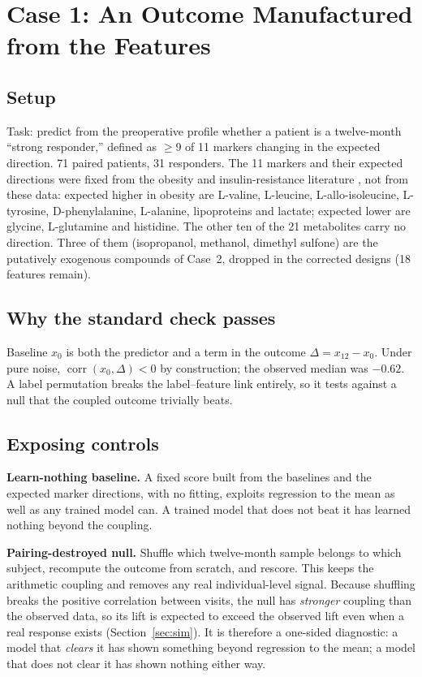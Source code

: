 \documentclass[conference]{IEEEtran}
\newcommand{\verified}[1]{#1}  %
\begin{document}
\section{Case 1: An Outcome Manufactured from the Features}
\label{sec:case1}

\subsection{Setup}
Task: predict from the preoperative profile whether a patient is a
twelve-month ``strong responder,'' defined as $\geq$9 of 11 markers changing
in the expected direction. 71 paired patients, 31 responders. The 11 markers
and their expected directions were fixed from the obesity and insulin-resistance
literature \cite{newgard2009, wang2011}, not from these data: expected higher in
obesity are L-valine, L-leucine, L-allo-isoleucine, L-tyrosine,
D-phenylalanine, L-alanine, lipoproteins and lactate; expected lower are
glycine, L-glutamine and histidine. The other ten of the 21 metabolites carry no
direction. Three of them (isopropanol, methanol, dimethyl sulfone) are the
putatively exogenous compounds of Case~2, dropped in the corrected designs
(18 features remain).

\subsection{Why the standard check passes}
Baseline $x_0$ is both the predictor and a term in the outcome
$\Delta = x_{12} - x_0$. Under pure noise, $\operatorname{corr}(x_0, \Delta)<0$
by construction; the observed median was \verified{$-0.62$}. A label
permutation breaks the label--feature link entirely, so it tests against a
null that the coupled outcome trivially beats.

\subsection{Exposing controls}
\textbf{Learn-nothing baseline.} A fixed score built from the baselines and
the expected marker directions, with no fitting, exploits regression to the
mean as well as any trained model can. A trained model that does not beat it
has learned nothing beyond the coupling.

\textbf{Pairing-destroyed null.} Shuffle which twelve-month sample belongs
to which subject, recompute the outcome from scratch, and rescore. This keeps
the arithmetic coupling and removes any real individual-level signal. Because
shuffling breaks the positive correlation between visits, the null has
\emph{stronger} coupling than the observed data, so its lift is expected to
exceed the observed lift even when a real response exists
(Section~\ref{sec:sim}). It is therefore a one-sided diagnostic: a model that
\emph{clears} it has shown something beyond regression to the mean; a model
that does not clear it has shown nothing either way.
\end{document}

